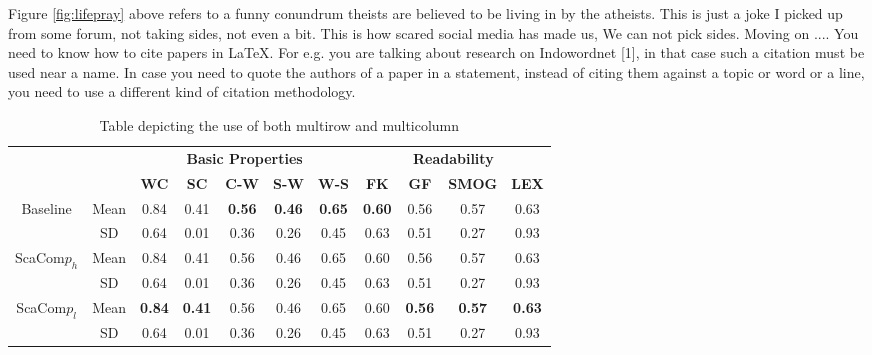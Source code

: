 \documentclass[a4paper,12pt]{extarticle}
\begin{document}
Figure \ref{fig:lifepray} above refers to a funny conundrum theists are believed to
be living in by the atheists. This is just a joke I picked up from some
forum, not taking sides, not even a bit. This is how scared social media
has made us, We can not pick sides. Moving on .... You need to know
how to cite papers in \LaTeX. For e.g. you are talking about research
on Indowordnet [1], in that case such a citation must be used near a
name. In case you need to quote the authors of a paper in a statement,
instead of citing them against a topic or word or a line, you need to use
a different kind of citation methodology.

\newpage
\vspace*{0.5cm}
  \begin{table}[h]
  \small\addtolength{\tabcolsep}{-3pt}
\centering
\caption{Table depicting the use of both multirow and multicolumn}

    \begin{tabular}{cc|c|c|c|c|c|c|c|c|c|}
     \cline{3-11}
     & & \multicolumn{5}{c|}{\textbf{Basic Properties}} & \multicolumn{4}{c|}{\textbf{Readability}}\\ \cline{3-11}
\cline{3-11}
   &&\textbf{WC} & \textbf{SC} & \textbf{C-W} & \textbf{S-W} & \textbf{W-S} & \textbf{FK} & \textbf{GF} & \textbf{SMOG} & \textbf{LEX}\\
\cline{1-11}
\multicolumn{1}{|c}{\multirow{2}{*}{Baseline}}&\multicolumn{1}{|c|}{Mean}& 0.84 & 0.41 & \textbf{0.56} & \textbf{0.46} & \textbf{0.65} & \textbf{0.60} & 0.56 & 0.57 & 0.63\\ \cline{2-11}
\multicolumn{1}{|c}{\multirow{2}{*}{}}&\multicolumn{1}{|c|}{SD}& 0.64 & 0.01 & 0.36 & 0.26 & 0.45 & 0.63 & 0.51 & 0.27 & 0.93\\ \hline
\hline
\multicolumn{1}{|c}{\multirow{2}{*}{ScaCom$p_h$}}&\multicolumn{1}{|c|}{Mean}& 0.84 & 0.41 & 0.56 & 0.46 & 0.65 & 0.60 & 0.56 & 0.57 & 0.63\\ \cline{2-11}
\multicolumn{1}{|c}{\multirow{2}{*}{}}&\multicolumn{1}{|c|}{SD}& 0.64 & 0.01 & 0.36 & 0.26 & 0.45 & 0.63 & 0.51 & 0.27 & 0.93\\ \hline
\hline
\multicolumn{1}{|c}{\multirow{2}{*}{ScaCom$p_l$}}&\multicolumn{1}{|c|}{Mean}& \textbf{0.84} & \textbf{0.41} & 0.56 & 0.46 & 0.65 & 0.60 & \textbf{0.56} & \textbf{0.57} & \textbf{0.63}\\ \cline{2-11}
\multicolumn{1}{|c}{\multirow{2}{*}{}}&\multicolumn{1}{|c|}{SD}& 0.64 & 0.01 & 0.36 & 0.26 & 0.45 & 0.63 & 0.51 & 0.27 & 0.93\\
\cline{1-11}
    \end{tabular}


  \end{table}
\end{document}
